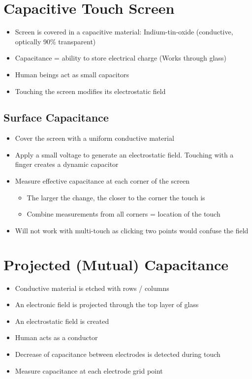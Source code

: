 \documentclass{article}
\begin{document}
\section{Capacitive Touch Screen}

\begin{itemize}  
  \item Screen is covered in a capacitive material: Indium-tin-oxide (conductive, optically 90\% transparent)
  \item Capacitance = ability to store electrical charge (Works through glass)
  \item Human beings act as small capacitors
  \item Touching the screen modifies its electrostatic field
\end{itemize}

\subsection{Surface Capacitance}

\begin{itemize}
  \item Cover the screen with a uniform conductive material
  \item Apply a small voltage to generate an electrostatic field. Touching with a finger creates a dynamic capacitor
  \item Measure effective capacitance at each corner of the screen
  \begin{itemize}
    \item The larger the change, the closer to the corner the touch is
    \item Combine measurements from all corners = location of the touch
  \end{itemize}
  \item Will not work with multi-touch as clicking two points would confuse the field
\end{itemize}

\section{Projected (Mutual) Capacitance}

\begin{itemize}
  \item Conductive material is etched with rows / columns
  \item An electronic field is projected through the top layer of glass
  \item An electrostatic field is created
  \item Human acts as a conductor
  \item Decrease of capacitance between electrodes is detected during touch 
  \item Measure capacitance at each electrode grid point
\end{itemize}
\end{document}

